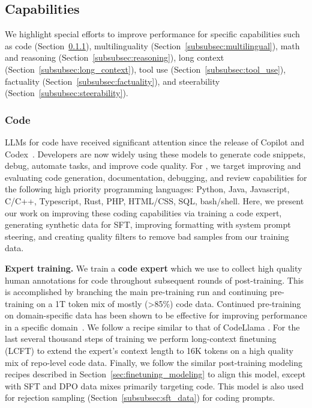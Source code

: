 \subsection{Capabilities}
\label{sec:Capabilities}

We highlight special efforts to improve performance for specific capabilities such as code (Section~\ref{subsubsec:code}), multilinguality (Section~\ref{subsubsec:multilingual}), math and reasoning (Section~\ref{subsubsec:reasoning}), long context (Section~\ref{subsubsec:long_context}), tool use (Section~\ref{subsubsec:tool_use}), factuality (Section~\ref{subsubsec:factuality}), and steerability (Section~\ref{subsubsec:steerability}).  

\subsubsection{Code}
\label{subsubsec:code}

LLMs for code have received significant attention since the release of Copilot and Codex~\citep{chen2021evaluating}. 
Developers are now widely using these models to generate code snippets, debug, automate tasks, and improve code quality.
For \llamathree, we target improving and evaluating code generation, documentation, debugging, and review capabilities for the following high priority programming languages: Python, Java, Javascript, C/C++, Typescript, Rust, PHP, HTML/CSS, SQL, bash/shell. 
Here, we present our work on improving these coding capabilities via training a code expert, generating synthetic data for SFT, improving formatting with system prompt steering, and creating quality filters to remove bad samples from our training data.

\textbf{Expert training.} We train a \textbf{code expert} which we use to collect high quality human annotations for code throughout subsequent rounds of post-training. This is accomplished by branching the main pre-training run and continuing pre-training on a 1T token mix of mostly (>85\%) code data. Continued pre-training on domain-specific data has been shown to be effective for improving performance in a specific domain~\citep{gururangan2024dontstoppretraining}. We follow a recipe similar to that of CodeLlama \citep{codellama}. For the last several thousand steps of training we perform {long-context finetuning} (LCFT) to extend the expert's context length to 16K tokens on a high quality mix of repo-level code data. Finally, we follow the similar post-training modeling recipes described in Section~\ref{sec:finetuning_modeling} to align this model, except with SFT and DPO data mixes primarily targeting code.  This model is also used for rejection sampling (Section~\ref{subsubsec:sft_data}) for coding prompts.

